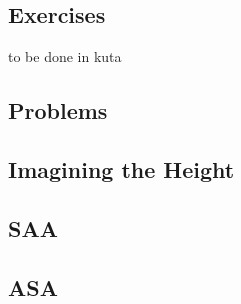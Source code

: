 \subsection{Exercises}
to be done in kuta

\newpage
{}
\subsection{Problems}
\noindent{}
\newpage
\subsection{Imagining the Height}
\subsection{SAA}
\subsection{ASA}
\newpage
